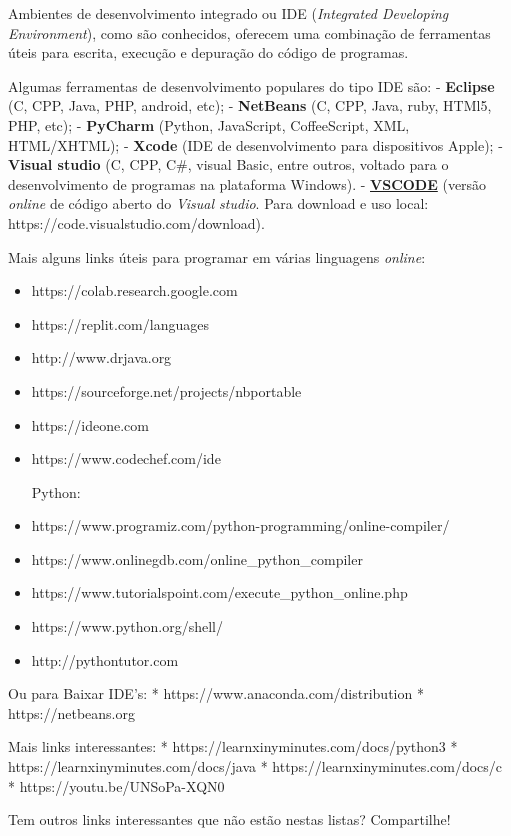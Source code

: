 \documentclass[12pt,a4paper]{article}
\begin{document}
    Ambientes de desenvolvimento integrado ou IDE (\emph{Integrated
Developing Environment}), como são conhecidos, oferecem uma combinação
de ferramentas úteis para escrita, execução e depuração do código de
programas.

    Algumas ferramentas de desenvolvimento populares do tipo IDE são: -
\textbf{Eclipse} (C, CPP, Java, PHP, android, etc); - \textbf{NetBeans}
(C, CPP, Java, ruby, HTMl5, PHP, etc); - \textbf{PyCharm} (Python,
JavaScript, CoffeeScript, XML, HTML/XHTML); - \textbf{Xcode} (IDE de
desenvolvimento para dispositivos Apple); - \textbf{Visual studio} (C,
CPP, C\#, visual Basic, entre outros, voltado para o desenvolvimento de
programas na plataforma Windows). -
\textbf{\href{https://vscode.dev}{VSCODE}} (versão \emph{online} de
código aberto do \emph{Visual studio}. Para download e uso local:
https://code.visualstudio.com/download).

    Mais alguns links úteis para programar em várias linguagens
\emph{online}:

\begin{itemize}
\item
  https://colab.research.google.com
\item
  https://replit.com/languages
\item
  http://www.drjava.org
\item
  https://sourceforge.net/projects/nbportable
\item
  https://ideone.com
\item
  https://www.codechef.com/ide

  Python:
\item
  https://www.programiz.com/python-programming/online-compiler/
\item
  https://www.onlinegdb.com/online\_python\_compiler
\item
  https://www.tutorialspoint.com/execute\_python\_online.php
\item
  https://www.python.org/shell/
\item
  http://pythontutor.com
\end{itemize}

Ou para Baixar IDE's: * https://www.anaconda.com/distribution *
https://netbeans.org

Mais links interessantes: * https://learnxinyminutes.com/docs/python3 *
https://learnxinyminutes.com/docs/java *
https://learnxinyminutes.com/docs/c * https://youtu.be/UNSoPa-XQN0

Tem outros links interessantes que não estão nestas listas? Compartilhe!
\end{document}

